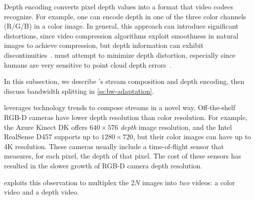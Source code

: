 Depth encoding converts pixel depth values into a format that video codecs recognize.
%
For example, one can encode depth in one of the three color channels (R/G/B) in a color image.
%
In general, this approach can introduce significant distortions, since video compression algorithms exploit smoothness in natural images to achieve compression, but depth information can exhibit discontinuities~\cite{depth-kautz,depth-antonio,depth-wilson}.
%
\livo{} must attempt to minimize depth distortion, especially since humans are very sensitive to point cloud depth errors~\cite{graphsim}.

In this subsection, we describe \livo{}'s stream composition and depth encoding, then discuss bandwidth splitting in \cref{ss:bw-adaptation}.

%
\livo leverages technology trends to compose streams in a novel way.
%
Off-the-shelf RGB-D cameras have lower depth resolution than color resolution.
%
For example, the Azure Kinect DK offers $640 \times 576$ \textit{depth} image resolution, and the Intel RealSense D457 supports up to $1280 \times 720$, but their color images can have up to 4K resolution. %
%
These cameras usually include a time-of-flight sensor that measures, for each pixel, the depth of that pixel.
%
The cost of these sensors has resulted in the slower growth of RGB-D camera depth resolution.

\livo exploits this observation to multiplex the 2$N$ images into \textit{two} videos: a color video and a depth video.


